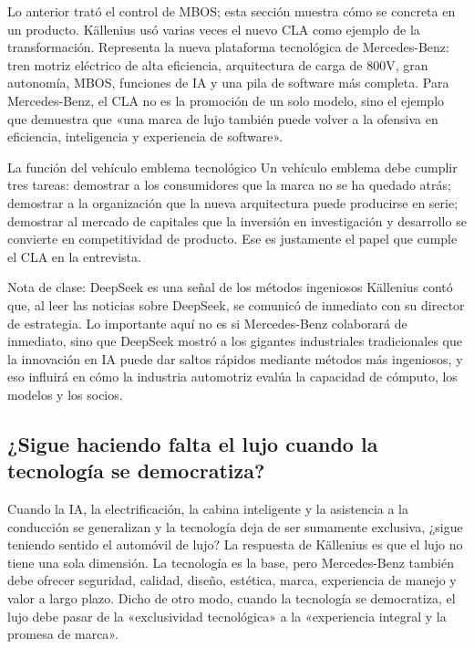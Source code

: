 \documentclass[a4paper]{article}
\begin{document}
Lo anterior trató el control de MBOS; esta sección muestra cómo se concreta en un producto. Källenius usó varias veces el nuevo CLA como ejemplo de la transformación. Representa la nueva plataforma tecnológica de Mercedes-Benz: tren motriz eléctrico de alta eficiencia, arquitectura de carga de 800V, gran autonomía, MBOS, funciones de IA y una pila de software más completa. Para Mercedes-Benz, el CLA no es la promoción de un solo modelo, sino el ejemplo que demuestra que «una marca de lujo también puede volver a la ofensiva en eficiencia, inteligencia y experiencia de software».

\begin{importantbox}{La función del vehículo emblema tecnológico}
Un vehículo emblema debe cumplir tres tareas: demostrar a los consumidores que la marca no se ha quedado atrás; demostrar a la organización que la nueva arquitectura puede producirse en serie; demostrar al mercado de capitales que la inversión en investigación y desarrollo se convierte en competitividad de producto. Ese es justamente el papel que cumple el CLA en la entrevista.
\end{importantbox}

\begin{importantbox}{Nota de clase: DeepSeek es una señal de los métodos ingeniosos}
Källenius contó que, al leer las noticias sobre DeepSeek, se comunicó de inmediato con su director de estrategia. Lo importante aquí no es si Mercedes-Benz colaborará de inmediato, sino que DeepSeek mostró a los gigantes industriales tradicionales que la innovación en IA puede dar saltos rápidos mediante métodos más ingeniosos, y eso influirá en cómo la industria automotriz evalúa la capacidad de cómputo, los modelos y los socios.
\end{importantbox}

\subsection{¿Sigue haciendo falta el lujo cuando la tecnología se democratiza?}

Cuando la IA, la electrificación, la cabina inteligente y la asistencia a la conducción se generalizan y la tecnología deja de ser sumamente exclusiva, ¿sigue teniendo sentido el automóvil de lujo? La respuesta de Källenius es que el lujo no tiene una sola dimensión. La tecnología es la base, pero Mercedes-Benz también debe ofrecer seguridad, calidad, diseño, estética, marca, experiencia de manejo y valor a largo plazo. Dicho de otro modo, cuando la tecnología se democratiza, el lujo debe pasar de la «exclusividad tecnológica» a la «experiencia integral y la promesa de marca».
\end{document}
